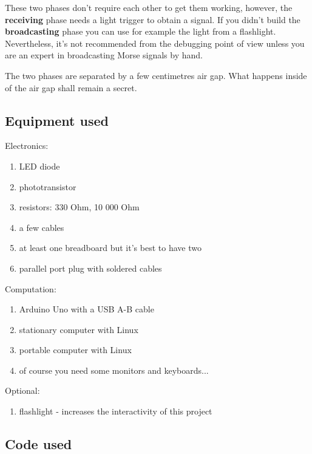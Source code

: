 \documentclass[12pt]{report}
\begin{document}
These two phases don't require each other to get them working, however, the \textbf{receiving} phase needs a light trigger to obtain a signal. If you didn't build the  \textbf{broadcasting} phase you can use for example the light from a flashlight. Nevertheless, it's not recommended from the debugging point of view unless you are an expert in broadcasting Morse signals by hand.

The two phases are separated by a few centimetres air gap. What happens inside of the air gap shall remain a secret.

\subsection{Equipment used} 

Electronics:

\begin{enumerate}

\item LED diode
\item phototransistor
\item resistors: 330 Ohm, 10 000 Ohm
\item a few cables
\item at least one breadboard but it's best to have two
\item parallel port plug with soldered cables

\end{enumerate}

Computation:

\begin{enumerate}

\item Arduino Uno with a USB A-B cable
\item stationary computer with Linux
\item portable computer with Linux
\item of course you need some monitors and keyboards...

\end{enumerate}

Optional:

\begin{enumerate}

\item flashlight - increases the interactivity of this project

\end{enumerate}

\newpage

\subsection{Code used}
\end{document}
